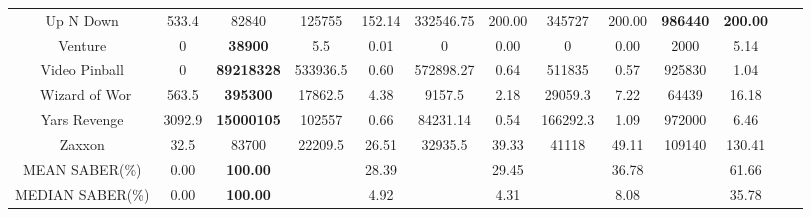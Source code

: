 \documentclass[nohyperref]{article}
\def\GDIImeanSABER{61.66}
\def\GDIImedianSABER{35.78}
\def\rainbowmeanSABER{28.39}
\def\rainbowmedianSABER{4.92}
\def\impalameanSABER{29.45}
\def\impalamedianSABER{4.31}
\def\lasermeanSABER{36.78}
\def\lasermedianSABER{8.08}
\newcommand{\best}[1]{\textbf{#1}}
\theoremstyle{plain}
\begin{document}
\begin{table}[!hb]
\begin{center}
\begin{tabular}{ |c |c |c| c c| c c|  c c |c c |c c |}
 Up N Down          & 533.4     & 82840              & 125755   &152.14  & 332546.75  & 200.00     & 345727  & 200.00    &\best{986440}     &\best{200.00  } \\
 Venture            & 0         & \textbf{38900}     & 5.5      &0.01    & 0          & 0.00       & 0       & 0.00      &2000    &5.14                     \\
 Video Pinball      & 0         & \textbf{89218328}  & 533936.5 &0.60    & 572898.27  & 0.64       & 511835  & 0.57      &925830  &1.04                      \\\
 Wizard of Wor      & 563.5     & \textbf{395300}    & 17862.5  &4.38    & 9157.5     & 2.18       & 29059.3 & 7.22      &64439   &16.18                     \\
 Yars Revenge       & 3092.9    & \textbf{15000105}  & 102557   &0.66    & 84231.14   & 0.54       & 166292.3& 1.09      &972000  &6.46                      \\
 Zaxxon             & 32.5      & 83700              & 22209.5  &26.51   & 32935.5    & 39.33      & 41118   & 49.11     &109140     &130.41   \\
\hline
MEAN SABER(\%) &     0.00 & \textbf{100.00}   &         & \rainbowmeanSABER &         & \impalameanSABER  &        & \lasermeanSABER &      & \GDIImeanSABER\\
\hline
MEDIAN SABER(\%) & 0.00   & \textbf{100.00}   &         &\rainbowmedianSABER &         & \impalamedianSABER  &        & \lasermedianSABER  &      & \GDIImedianSABER  \\
\hline
\end{tabular}
\end{center}
\end{table}
\clearpage
\end{document}
